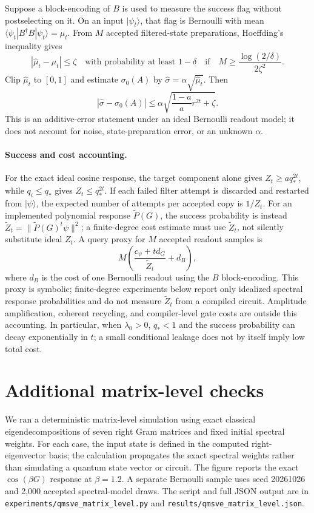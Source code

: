 \documentclass[11pt]{article}
\newcommand{\ket}[1]{\lvert #1\rangle}
\begin{document}
Suppose a block-encoding of $B$ is used to measure the success flag without postselecting on it. On an input $\ket{\psi_t}$, that flag is Bernoulli with mean $\langle\psi_t|B^\dagger B|\psi_t\rangle=\mu_t$. From $M$ accepted filtered-state preparations, Hoeffding's inequality gives
\[
 |\widehat\mu_t-\mu_t|\leq \zeta
 \quad\text{with probability at least }1-\delta
 \quad\text{if}\quad
 M\geq\frac{\log(2/\delta)}{2\zeta^2}.
\]
Clip $\widehat\mu_t$ to $[0,1]$ and estimate $\sigma_0(A)$ by $\widehat\sigma=\alpha\sqrt{\widehat\mu_t}$. Then
\[
 |\widehat\sigma-\sigma_0(A)|
 \leq \alpha\sqrt{\frac{1-a}{a}r^{2t}+\zeta}.
\]
This is an additive-error statement under an ideal Bernoulli readout model; it does not account for noise, state-preparation error, or an unknown $\alpha$.

\paragraph{Success and cost accounting.}
For the exact ideal cosine response, the target component alone gives $Z_t\geq a q_*^{2t}$, while $q_i\leq q_*$ gives $Z_t\leq q_*^{2t}$. If each failed filter attempt is discarded and restarted from $\ket{\psi}$, the expected number of attempts per accepted copy is $1/Z_t$. For an implemented polynomial response $\widetilde P(G)$, the success probability is instead $\widetilde Z_t=\|\widetilde P(G)^t\psi\|^2$; a finite-degree cost estimate must use $\widetilde Z_t$, not silently substitute ideal $Z_t$. A query proxy for $M$ accepted readout samples is
\[
 M\left(\frac{c_\psi+t d_G}{\widetilde Z_t}+d_B\right),
\]
where $d_B$ is the cost of one Bernoulli readout using the $B$ block-encoding. This proxy is symbolic; finite-degree experiments below report only idealized spectral response probabilities and do not measure $\widetilde Z_t$ from a compiled circuit. Amplitude amplification, coherent recycling, and compiler-level gate costs are outside this accounting. In particular, when $\lambda_0>0$, $q_*<1$ and the success probability can decay exponentially in $t$; a small conditional leakage does not by itself imply low total cost.



\section{Additional matrix-level checks}
We ran a deterministic matrix-level simulation using exact classical eigendecompositions of seven right Gram matrices and fixed initial spectral weights. For each case, the input state is defined in the computed right-eigenvector basis; the calculation propagates the exact spectral weights rather than simulating a quantum state vector or circuit. The figure reports the exact $\cos(\beta G)$ response at $\beta=1.2$. A separate Bernoulli sample uses seed 20261026 and 2,000 accepted spectral-model draws. The script and full JSON output are in \texttt{experiments/qmsve\_matrix\_level.py} and \texttt{results/qmsve\_matrix\_level.json}.
\end{document}
